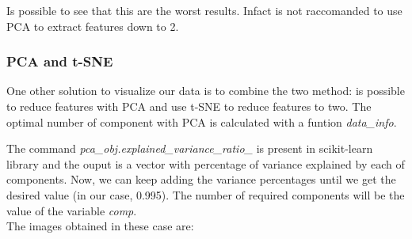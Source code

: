 \documentclass[12pt]{article} %
\begin{document}
Is possible to see that this are the worst results. Infact is not raccomanded to use PCA to extract features down to 2. 
\subsubsection {PCA and t-SNE}
One other solution to visualize our data is to combine the two method: is possible to reduce features with PCA and use t-SNE to reduce features to two.
The optimal number of component with PCA is calculated with a funtion \textit{data\_info}. 

\begin{figure}[H] %
\end{figure}

The command \textit{pca\_obj.explained\_variance\_ratio\_} is present in  scikit-learn library and the ouput is  a vector with percentage of variance explained by each of components. Now, we can keep adding the variance percentages until we get the desired value (in our case, 0.995). The number of required components will be the value of the variable \textit{comp}.\\ 
 The images obtained in these case are:\\
\end{document}
